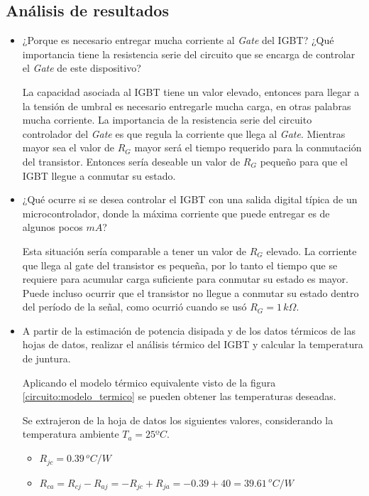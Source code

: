 \documentclass[10pt,spanish,a4paper,openany,notitlepage]{article}
\begin{document}
\subsection{Análisis de resultados}

\begin{itemize}
\item ¿Porque es necesario entregar mucha corriente al \emph{Gate} del IGBT?
¿Qué importancia tiene la resistencia serie del circuito que se encarga de 
controlar el \emph{Gate} de este dispositivo?

La capacidad asociada al IGBT tiene un valor elevado, entonces para llegar 
a la tensión de umbral es necesario entregarle mucha carga, en otras 
palabras mucha corriente.
La importancia de la resistencia serie del circuito controlador del 
\emph{Gate} es que regula la corriente que llega al \emph{Gate}. 
Mientras mayor sea el valor de $R_G$ mayor será el 
tiempo requerido para la conmutación del transistor. Entonces sería 
deseable un valor de $R_G$ pequeño para que el IGBT llegue a conmutar 
su estado.


\item ¿Qué ocurre si se desea controlar el IGBT con una salida digital 
típica de un microcontrolador, donde la máxima corriente que puede 
entregar es de algunos pocos $\unit{mA}$?

Esta situación sería comparable a tener un valor de $R_G$ elevado. 
La corriente que llega al gate del transistor es pequeña, por lo tanto 
el tiempo que se requiere para acumular carga suficiente para conmutar 
su estado es mayor. Puede incluso ocurrir que el transistor no llegue a 
conmutar su estado dentro del período de la señal, como ocurrió cuando 
se usó $R_G=1\,k\unit{\Omega}$.

\item A partir de la estimación de potencia disipada y de los datos 
térmicos de las hojas de datos, realizar el análisis térmico del IGBT y 
calcular la temperatura de juntura.

Aplicando el modelo térmico equivalente visto de la figura 
\ref{circuito:modelo_termico} se pueden obtener las temperaturas deseadas. 

Se extrajeron de la hoja de datos los siguientes valores, considerando
la temperatura ambiente $T_a=25ºC$.
 
\begin{itemize}
\item $R_{jc}=0.39\,\unit{^oC/W}$
\item $R_{ca}= R_{cj} - R_{aj} = -R_{jc} + R_{ja} = -0.39 + 40 = 39.61\,\unit{^oC/W}$
\end{itemize}
 

\end{itemize}
\end{document}
